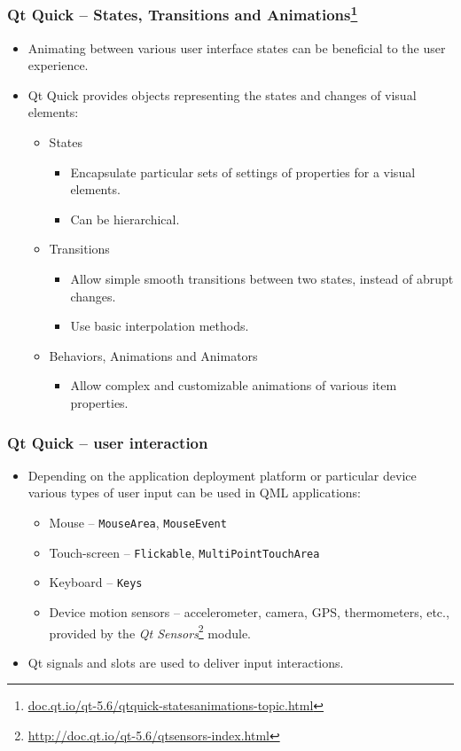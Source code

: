 \begin{frame}
  \frametitle{Qt Quick -- States, Transitions and Animations\footnote
    {\url{doc.qt.io/qt-5.6/qtquick-statesanimations-topic.html}}}
  \small
  \begin{itemize}
    \item Animating between various user interface states can be beneficial
      to the user experience.
    \item Qt Quick provides objects representing the states and changes
      of visual elements:
      \begin{itemize}
        \item States
        \begin{itemize}
          \item Encapsulate particular sets of settings of properties 
          for a visual elements.
          \item Can be hierarchical.
        \end{itemize}
        \item Transitions
        \begin{itemize}
          \item Allow simple smooth transitions between two states, instead
            of abrupt changes.
          \item Use basic interpolation methods.
        \end{itemize}
        \item Behaviors, Animations and Animators
        \begin{itemize}
          \item Allow complex and customizable animations of various item
            properties.
        \end{itemize}
      \end{itemize}
  \end{itemize}
\end{frame}

\begin{frame}
  \frametitle{Qt Quick -- user interaction}
  \begin{itemize}
    \item Depending on the application deployment platform or particular device
      various types of user input can be used in QML applications:
      \begin{itemize}
        \item Mouse -- \texttt{MouseArea}, \texttt{MouseEvent}
        \item Touch-screen -- \texttt{Flickable}, \texttt{MultiPointTouchArea}
        \item Keyboard -- \texttt{Keys}
        \item Device motion sensors -- accelerometer, camera, GPS, thermometers,
          etc., provided by the {\em Qt Sensors}\footnote
          {\url{http://doc.qt.io/qt-5.6/qtsensors-index.html}} module.
      \end{itemize}
      \item Qt signals and slots are used to deliver input interactions.
  \end{itemize}
\end{frame}


